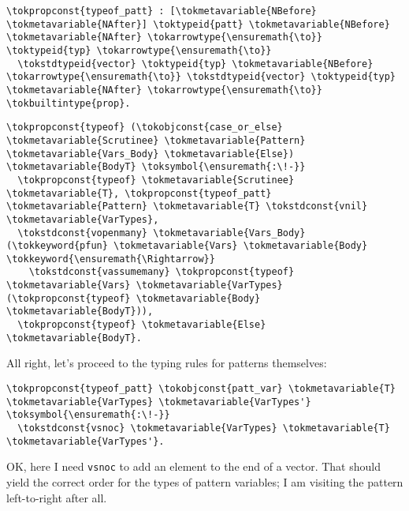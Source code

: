 \importantCodeblock{}

\begin{verbatim}
\tokpropconst{typeof_patt} : [\tokmetavariable{NBefore} \tokmetavariable{NAfter}] \toktypeid{patt} \tokmetavariable{NBefore} \tokmetavariable{NAfter} \tokarrowtype{\ensuremath{\to}} \toktypeid{typ} \tokarrowtype{\ensuremath{\to}}
  \tokstdtypeid{vector} \toktypeid{typ} \tokmetavariable{NBefore} \tokarrowtype{\ensuremath{\to}} \tokstdtypeid{vector} \toktypeid{typ} \tokmetavariable{NAfter} \tokarrowtype{\ensuremath{\to}} \tokbuiltintype{prop}.
\end{verbatim}

\importantCodeblock{}

\begin{verbatim}
\tokpropconst{typeof} (\tokobjconst{case_or_else} \tokmetavariable{Scrutinee} \tokmetavariable{Pattern} \tokmetavariable{Vars_Body} \tokmetavariable{Else}) \tokmetavariable{BodyT} \toksymbol{\ensuremath{:\!-}}
  \tokpropconst{typeof} \tokmetavariable{Scrutinee} \tokmetavariable{T}, \tokpropconst{typeof_patt} \tokmetavariable{Pattern} \tokmetavariable{T} \tokstdconst{vnil} \tokmetavariable{VarTypes},
  \tokstdconst{vopenmany} \tokmetavariable{Vars_Body} (\tokkeyword{pfun} \tokmetavariable{Vars} \tokmetavariable{Body} \tokkeyword{\ensuremath{\Rightarrow}}
    \tokstdconst{vassumemany} \tokpropconst{typeof} \tokmetavariable{Vars} \tokmetavariable{VarTypes} (\tokpropconst{typeof} \tokmetavariable{Body} \tokmetavariable{BodyT})),
  \tokpropconst{typeof} \tokmetavariable{Else} \tokmetavariable{BodyT}.
\end{verbatim}

\importantCodeblockEnd{}

All right, let's proceed to the typing rules for patterns themselves:

\importantCodeblock{}

\begin{verbatim}
\tokpropconst{typeof_patt} \tokobjconst{patt_var} \tokmetavariable{T} \tokmetavariable{VarTypes} \tokmetavariable{VarTypes'} \toksymbol{\ensuremath{:\!-}}
  \tokstdconst{vsnoc} \tokmetavariable{VarTypes} \tokmetavariable{T} \tokmetavariable{VarTypes'}.
\end{verbatim}

\importantCodeblockEnd{}

OK, here I need \texttt{vsnoc} to add an element to the end of a vector.
That should yield the correct order for the types of pattern variables;
I am visiting the pattern left-to-right after all.

